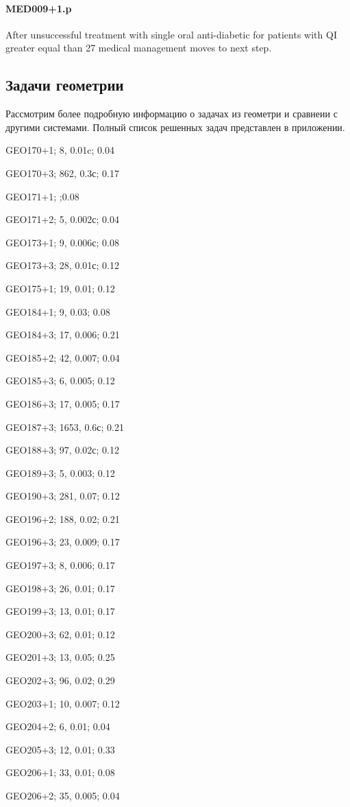 \paragraph{MED009+1.p}
After unsuccessful treatment with single oral anti-diabetic for patients with QI greater equal than 27 medical management moves to next step.

\subsection{Задачи геометрии}
Рассмотрим более подробную информацию о задачах из геометри и сравнеии с другими системами. Полный список решенных задач представлен в приложении.

GEO170+1; 8, 0.01c; 0.04

GEO170+3; 862, 0.3с; 0.17

GEO171+1; ;0.08

GEO171+2; 5, 0.002с; 0.04

GEO173+1; 9, 0.006с; 0.08

GEO173+3; 28, 0.01с; 0.12

GEO175+1; 19, 0.01; 0.12

GEO184+1; 9, 0.03; 0.08

GEO184+3; 17, 0.006; 0.21

GEO185+2; 42, 0.007; 0.04

GEO185+3; 6, 0.005; 0.12

GEO186+3; 17, 0.005; 0.17

GEO187+3; 1653, 0.6с; 0.21

GEO188+3; 97, 0.02с; 0.12

GEO189+3; 5, 0.003; 0.12

GEO190+3; 281, 0.07; 0.12

GEO196+2; 188, 0.02; 0.21

GEO196+3; 23, 0.009; 0.17

GEO197+3; 8, 0.006; 0.17

GEO198+3; 26, 0.01; 0.17

GEO199+3; 13, 0.01; 0.17

GEO200+3; 62, 0.01; 0.12

GEO201+3; 13, 0.05; 0.25

GEO202+3; 96, 0.02; 0.29

GEO203+1; 10, 0.007; 0.12

GEO204+2; 6, 0.01; 0.04 

GEO205+3; 12, 0.01; 0.33

GEO206+1; 33, 0.01; 0.08

GEO206+2; 35, 0.005; 0.04


